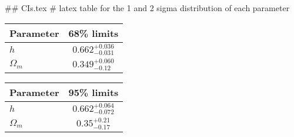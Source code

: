 ## CIs.tex
# latex table for the 1 and 2 sigma distribution of each parameter

\begin{tabular} { l  c}
 Parameter &  68\% limits\\
\hline
{\boldmath$h              $} & $0.662^{+0.036}_{-0.031}   $\\
{\boldmath$\Omega_m       $} & $0.349^{+0.060}_{-0.12}    $\\
\hline
\end{tabular}

\begin{tabular} { l  c}
 Parameter &  95\% limits\\
\hline
{\boldmath$h              $} & $0.662^{+0.064}_{-0.072}   $\\
{\boldmath$\Omega_m       $} & $0.35^{+0.21}_{-0.17}      $\\
\hline
\end{tabular}
